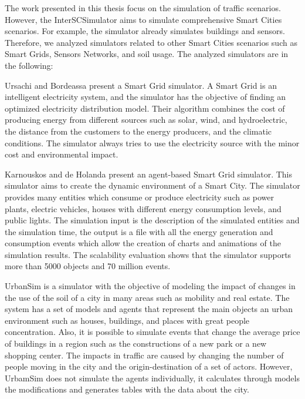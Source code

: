 The work presented in this thesis focus on the simulation of traffic scenarios. However, the InterSCSimulator aims to simulate comprehensive Smart Cities scenarios. For example, the simulator already simulates buildings and sensors. Therefore, we analyzed simulators related to other Smart Cities scenarios such as Smart Grids, Sensors Networks, and soil usage. The analyzed simulators are in the following:

Ursachi and Bordeassa \citep{ursachi2014smart} present a Smart Grid simulator. A Smart Grid is an intelligent electricity system, and the simulator has the objective of finding an optimized electricity distribution model. Their algorithm combines the cost of producing energy from different sources such as solar, wind, and hydroelectric, the distance from the customers to the energy producers, and the climatic conditions. The simulator always tries to use the electricity source with the minor cost and environmental impact.

Karnouskos and de Holanda \citep{karnouskos2009simulation}  present an agent-based Smart Grid simulator. This simulator aims to create the dynamic environment of a Smart City. The simulator provides many entities which consume or produce electricity such as power plants, electric vehicles, houses with different energy consumption levels, and public lights. The simulation input is the description of the simulated entities and the simulation time, the output is a file with all the energy generation and consumption events which allow the creation of charts and animations of the simulation results. The scalability evaluation shows that the simulator supports more than 5000 objects and 70 million events.

UrbanSim \citep{waddell2003microsimulation} is a simulator with the objective of modeling the impact of changes in the use of the soil of a city in many areas such as mobility and real estate. The system has a set of models and agents that represent the main objects an urban environment such as houses, buildings, and places with great people concentration. Also, it is possible to simulate events that change the average price of buildings in a region such as the constructions of a new park or a new shopping center. The impacts in traffic are caused by changing the number of people moving in the city and the origin-destination of a set of actors. However, UrbamSim does not simulate the agents individually, it calculates through models the modifications and generates tables with the data about the city.

